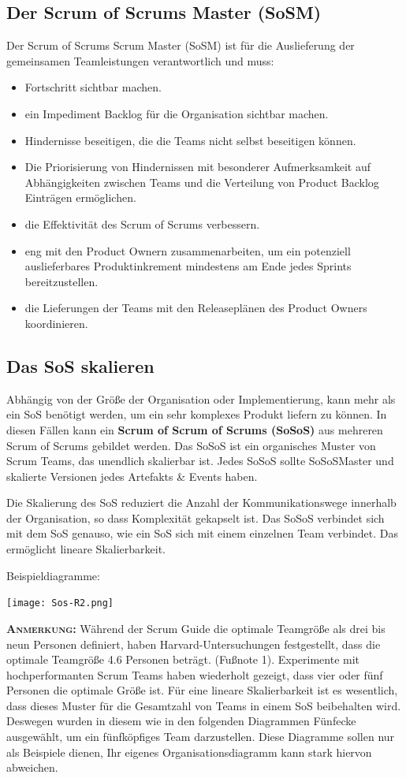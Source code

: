 \documentclass[12pt,a4paper,parskip=full]{scrartcl}
\begin{document}
\subsection{Der Scrum of Scrums Master (SoSM)}
Der Scrum of Scrums Scrum Master (SoSM) ist für die Auslieferung der gemeinsamen Teamleistungen verantwortlich und muss:
\begin{itemize}
\item Fortschritt sichtbar machen.
\item ein Impediment Backlog für die Organisation sichtbar machen.
\item Hindernisse beseitigen, die die Teams nicht selbst beseitigen können.
\item Die Priorisierung von Hindernissen mit besonderer Aufmerksamkeit auf Abhängigkeiten zwischen Teams und die Verteilung von Product Backlog Einträgen ermöglichen.
\item die Effektivität des Scrum of Scrums verbessern.
\item eng mit den Product Ownern zusammenarbeiten, um ein potenziell auslieferbares Produktinkrement mindestens am Ende jedes Sprints bereitzustellen.
\item die Lieferungen der Teams mit den Releaseplänen des Product Owners koordinieren.
\end{itemize}

\subsection{Das SoS skalieren}
Abhängig von der Größe der Organisation oder Implementierung, kann mehr als ein
SoS benötigt werden, um ein sehr komplexes Produkt liefern zu können. In diesen
Fällen kann ein \textbf{Scrum of Scrum of Scrums (SoSoS)} aus mehreren Scrum of Scrums
gebildet werden. Das SoSoS ist ein organisches Muster von Scrum Teams, das
unendlich skalierbar ist. Jedes SoSoS sollte SoSoSMaster und skalierte Versionen
jedes Artefakts \& Events haben.

Die Skalierung des SoS reduziert die Anzahl der Kommunikationswege innerhalb
der Organisation, so dass Komplexität gekapselt ist. Das SoSoS verbindet sich
mit dem SoS genauso, wie ein SoS sich mit einem einzelnen Team verbindet. Das
ermöglicht lineare Skalierbarkeit.

\pagebreak
Beispieldiagramme:

\texttt{[image: Sos-R2.png]}

\textbf{\textsc{Anmerkung:}} Während der Scrum Guide die optimale Teamgröße als
drei bis neun Personen definiert, haben Harvard-Untersuchungen festgestellt,
dass die optimale Teamgröße 4.6 Personen beträgt. (Fußnote 1). Experimente mit
hochperformanten Scrum Teams haben wiederholt gezeigt, dass vier oder fünf
Personen die optimale Größe ist. Für eine lineare Skalierbarkeit ist es
wesentlich, dass dieses Muster für die Gesamtzahl von Teams in einem SoS
beibehalten wird. Deswegen wurden in diesem wie in den folgenden Diagrammen
Fünfecke ausgewählt, um ein fünfköpfiges Team darzustellen. Diese Diagramme
sollen nur als Beispiele dienen, Ihr eigenes Organisationsdiagramm kann stark
hiervon abweichen.
\end{document}
